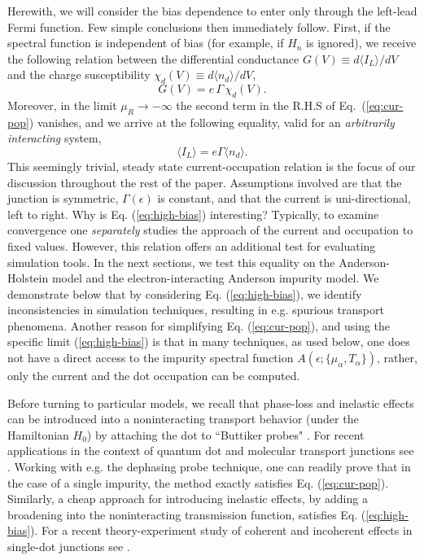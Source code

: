\documentclass[aps,pra,twocolumn,groupedaddress,showpacs,superscriptaddress,amssymb,amsmath]{revtex4-1}
\newcommand{\be}{\begin{equation}}
\newcommand{\ee}{\end{equation}}
\begin{document}
Herewith, we will consider the bias dependence to enter only through the left-lead Fermi function. 
Few simple conclusions then immediately follow. %
First, if the spectral function is independent of bias 
(for example, if $H_n$ is ignored), we receive the following relation 
between the differential conductance $G(V)\equiv d\langle I_L \rangle/{dV}$ 
and the charge susceptibility $\chi_d(V) \equiv d\langle n_d \rangle/{dV}$, 
%
\be
G(V) = e \, \Gamma \,\chi_d(V).
\ee 
%
Moreover, in the limit $\mu_R \to -\infty$ the second term in the R.H.S of Eq.~(\ref{eq:cur-pop}) vanishes, and we arrive 
at the following equality, valid for an {\it arbitrarily  interacting} system, 
%
\be
\langle I_L \rangle =e \Gamma \langle n_d\rangle.
\label{eq:high-bias}
\ee
% 
This seemingly trivial, steady state current-occupation
relation is the focus of our discussion throughout the rest of the paper.
Assumptions involved are that the junction is symmetric, $\Gamma(\epsilon)$ is constant,
and that the current is uni-directional, left to right. 
%
%
Why is Eq. (\ref{eq:high-bias}) interesting?
Typically, to examine convergence one {\it separately} studies the approach of the current and occupation
to fixed values. However, this relation offers an additional test for evaluating simulation tools.
In the next sections,
we test this equality on the Anderson-Holstein model and the electron-interacting Anderson impurity model.
We demonstrate below that by considering Eq. (\ref{eq:high-bias}), we identify inconsistencies in simulation techniques,
resulting in e.g. spurious transport phenomena.
Another reason for simplifying Eq. (\ref{eq:cur-pop}), and using the specific limit (\ref{eq:high-bias}) is that in many techniques, as used below, 
one does not have a direct access to the impurity spectral function  $A(\epsilon; \{\mu_{\alpha},T_{\alpha}\})$, rather, only the current and the dot occupation 
can be computed.

Before turning to particular models, we recall that phase-loss and inelastic effects can be introduced into a
noninteracting transport behavior 
(under the Hamiltonian $H_0$) by attaching the dot to  ``Buttiker probes"  \cite{Buttiker}.  For recent applications
in the context of quantum dot and molecular transport junctions see  \cite{Salil1,Kilgour1,Kilgour2}.
Working with e.g. the dephasing probe technique, one can readily prove that in the case of a single impurity,
the method exactly satisfies Eq. (\ref{eq:cur-pop}). 
Similarly, a cheap approach for introducing inelastic effects,
by adding a broadening into the noninteracting transmission function,
satisfies Eq. (\ref{eq:high-bias}). For a recent theory-experiment study of 
coherent and incoherent effects in single-dot junctions
see \cite{Nijhuis}. %
\end{document}

